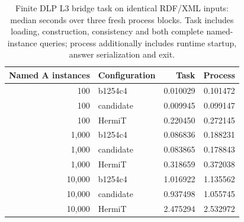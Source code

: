 \begin{table}[ht]
\caption{Finite DLP L3 bridge task on identical RDF/XML inputs: median seconds over three fresh process blocks. Task includes loading, construction, consistency and both complete named-instance queries; process additionally includes runtime startup, answer serialization and exit.}
\label{tab:hermit}
\centering\small
\begin{tabular}{@{}rlrr@{}}
\toprule
Named A instances & Configuration & Task & Process \\
\midrule
100 & b1254c4 & 0.010029 & 0.101472 \\
100 & candidate & 0.009945 & 0.099147 \\
100 & HermiT & 0.220450 & 0.272145 \\
1,000 & b1254c4 & 0.086836 & 0.188231 \\
1,000 & candidate & 0.083865 & 0.178843 \\
1,000 & HermiT & 0.318659 & 0.372038 \\
10,000 & b1254c4 & 1.016922 & 1.135562 \\
10,000 & candidate & 0.937498 & 1.055745 \\
10,000 & HermiT & 2.475294 & 2.532972 \\
\bottomrule
\end{tabular}
\end{table}
